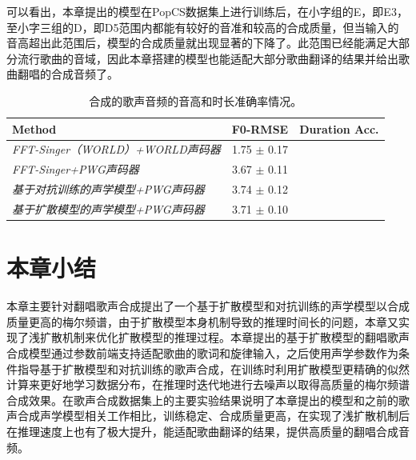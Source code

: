 可以看出，本章提出的模型在PopCS数据集上进行训练后，在小字组的E，即E3，至小字三组的D，即D5范围内都能有较好的音准和较高的合成质量，但当输入的音高超出此范围后，模型的合成质量就出现显著的下降了。此范围已经能满足大部分流行歌曲的音域，因此本章搭建的模型也能适配大部分歌曲翻译的结果并给出歌曲翻唱的合成音频了。
\begin{table}[!ht]
	\centering
	\setlength{\belowcaptionskip}{8pt} %
	\caption{合成的歌声音频的音高和时长准确率情况。}
	\begin{tabular}{|l|c|c|}
		\toprule
		Method &  F0-RMSE & Duration Acc.  \\
		\midrule
		\textit{FFT-Singer（WORLD）+WORLD声码器} & 1.75  $\pm$ 0.17 & \\
		\textit{FFT-Singer+PWG声码器} & 3.67 $\pm$ 0.11 &\\
		\textit{基于对抗训练的声学模型+PWG声码器} & 3.74 $\pm$ 0.12 & \\
		\midrule
		\textit{基于扩散模型的声学模型+PWG声码器} & 3.71 $\pm$ 0.10 &\\
		\bottomrule
	\end{tabular}
	\label{tab:singing_obj}
\end{table}
\section{本章小结}
本章主要针对翻唱歌声合成提出了一个基于扩散模型和对抗训练的声学模型以合成质量更高的梅尔频谱，由于扩散模型本身机制导致的推理时间长的问题，本章又实现了浅扩散机制\citep{diffsinger}来优化扩散模型的推理过程。本章提出的基于扩散模型的翻唱歌声合成模型通过参数前端支持适配歌曲的歌词和旋律输入，之后使用声学参数作为条件指导基于扩散模型和对抗训练的歌声合成，在训练时利用扩散模型更精确的似然计算来更好地学习数据分布，在推理时迭代地进行去噪声以取得高质量的梅尔频谱合成效果。在歌声合成数据集上的主要实验结果说明了本章提出的模型和之前的歌声合成声学模型相关工作相比，训练稳定、合成质量更高，在实现了浅扩散机制后在推理速度上也有了极大提升，能适配歌曲翻译的结果，提供高质量的翻唱合成音频。
